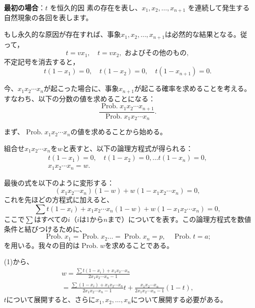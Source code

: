 \documentclass[a4paper,11pt,openany]{ltjsbook}
\begin{document}
\textbf{最初の場合}：$t$ を恒久的因 素の存在を表し、$x_1, x_2, \dots, x_{n+1}$ を連続して発生する自然現象の各回を表します。

もし永久的な原因が存在すれば、事象$x_1, x_2, \dots, x_{n+1}$は必然的な結果となる。従って，
\begin{equation*}
t = v x_1, \quad t = v x_2, \text{ およびその他のもの},
\end{equation*}
不定記号を消去すると，
\begin{equation*}
t(1-x_1) = 0, \quad t(1-x_2) = 0, \quad t(1-x_{n+1}) = 0.
\end{equation*}

今、$x_1 x_2 \dotsm x_n$が起こった場合に、事象$x_{n+1}$が起こる確率を求めることを考える。すなわち、以下の分数の値を求めることになる：
\begin{equation*}
\frac{\operatorname{Prob. } x_1 x_2 \dotsm x_{n+1}}
     {\operatorname{Prob. } x_1 x_2 \dotsm x_n}.
\end{equation*}

まず、$\operatorname{Prob. } x_1 x_2 \dotsm x_n$の値を求めることから始める。

組合せ$x_1 x_2 \dotsm x_n$を$w$と表すと、以下の論理方程式が得られる：
\begin{gather*}
t(1-x_1) = 0, \quad t(1-x_2) = 0, \dotsc t(1-x_n) = 0, \\
x_1 x_2 \dotsm x_n = w.
\end{gather*}

最後の式を以下のように変形する：
\[
(x_1 x_2 \dotsm x_n)(1-w) + w(1 - x_1 x_2 \dotsm x_n) = 0,
\]
これを先ほどの方程式に加えると、
\[
\sum t(1-x_i) + x_1 x_2 \dotsm x_n (1-w) + w(1- x_1 x_2 \dotsm x_n) = 0, \tag{1}
\]
ここで$\sum$はすべての$i$（$i$は1から$n$まで）についてを表す。この論理方程式を数値条件と結びつけるために、
\[
\operatorname{Prob. }x_1 = \operatorname{ Prob. }x_2 \dotsc = \operatorname{ Prob. }x_n = p, \quad \operatorname{Prob. }t = a;
\]
を用いる。我々の目的は$\operatorname{Prob. }w$を求めることである。

(1)から、
\begin{gather*}
w = \frac{\sum t(1-x_i) + x_1 x_2 \dotsm x_n}{2x_1 x_2 \dotsm x_n - 1} \\
= \frac{\sum (1-x_i) + x_1 x_2 \dotsm x_n}{2x_1 x_2 \dotsm x_n - 1} t
+ \frac{x_1 x_2 \dotsm x_n}{2x_1 x_2 \dotsm x_n - 1} (1-t), \tag{2}
\end{gather*}
$t$について展開すると、さらに$x_1, x_2, \dotsc, x_n$について展開する必要がある。
\end{document}

